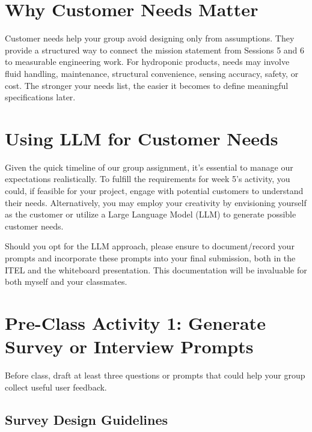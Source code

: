 \section{Why Customer Needs Matter}

Customer needs help your group avoid designing only from assumptions. They provide a structured way to connect the mission statement from Sessions 5 and 6 to measurable engineering work. For hydroponic products, needs may involve fluid handling, maintenance, structural convenience, sensing accuracy, safety, or cost. The stronger your needs list, the easier it becomes to define meaningful specifications later.

\section{Using LLM for Customer Needs}

Given the quick timeline of our group assignment, it's essential to manage our expectations realistically. To fulfill the requirements for week 5's activity, you could, if feasible for your project, engage with potential customers to understand their needs. Alternatively, you may employ your creativity by envisioning yourself as the customer or utilize a Large Language Model (LLM) to generate possible customer needs. 


Should you opt for the LLM approach, please ensure to document/record your prompts and incorporate these prompts into your final submission, both in the ITEL and the whiteboard presentation. This documentation will be invaluable for both myself and your classmates.


\section{Pre-Class Activity 1: Generate Survey or Interview Prompts}

Before class, draft at least three questions or prompts that could help your group collect useful user feedback.

\subsection{Survey Design Guidelines}



